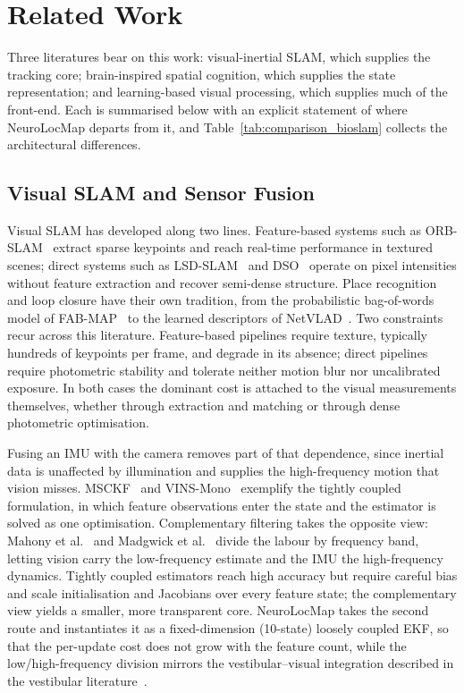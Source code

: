 \section{Related Work}
\label{sec:related}

Three literatures bear on this work: visual-inertial SLAM, which supplies the tracking core; brain-inspired spatial cognition, which supplies the state representation; and learning-based visual processing, which supplies much of the front-end. Each is summarised below with an explicit statement of where NeuroLocMap departs from it, and Table~\ref{tab:comparison_bioslam} collects the architectural differences.

\subsection{Visual SLAM and Sensor Fusion}
\label{sec:related_slam}

Visual SLAM has developed along two lines. Feature-based systems such as ORB-SLAM~\cite{mur2015orb} extract sparse keypoints and reach real-time performance in textured scenes; direct systems such as LSD-SLAM~\cite{engel2014lsd} and DSO~\cite{engel2018direct} operate on pixel intensities without feature extraction and recover semi-dense structure. Place recognition and loop closure have their own tradition, from the probabilistic bag-of-words model of FAB-MAP~\cite{Cummins2008} to the learned descriptors of NetVLAD~\cite{Arandjelovic2016}. Two constraints recur across this literature. Feature-based pipelines require texture, typically hundreds of keypoints per frame, and degrade in its absence; direct pipelines require photometric stability and tolerate neither motion blur nor uncalibrated exposure. In both cases the dominant cost is attached to the visual measurements themselves, whether through extraction and matching or through dense photometric optimisation.

Fusing an IMU with the camera removes part of that dependence, since inertial data is unaffected by illumination and supplies the high-frequency motion that vision misses. MSCKF~\cite{Mourikis2007} and VINS-Mono~\cite{Qin2018} exemplify the tightly coupled formulation, in which feature observations enter the state and the estimator is solved as one optimisation. Complementary filtering takes the opposite view: Mahony et al.~\cite{Mahony2008} and Madgwick et al.~\cite{Madgwick2011} divide the labour by frequency band, letting vision carry the low-frequency estimate and the IMU the high-frequency dynamics. Tightly coupled estimators reach high accuracy but require careful bias and scale initialisation and Jacobians over every feature state; the complementary view yields a smaller, more transparent core. NeuroLocMap takes the second route and instantiates it as a fixed-dimension (10-state) loosely coupled EKF, so that the per-update cost does not grow with the feature count, while the low/high-frequency division mirrors the vestibular--visual integration described in the vestibular literature~\cite{Angelaki2004,Cullen2012}.

